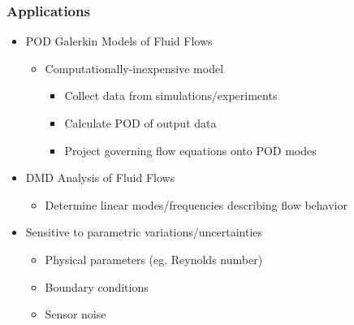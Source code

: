 \documentclass[9pt]{beamer}
\begin{document}
\begin{frame}
\frametitle{Applications}
\label{sec-1-2}

\begin{itemize}
\item POD Galerkin Models of Fluid Flows
\begin{itemize}
\item Computationally-inexpensive model
\begin{itemize}
\item Collect data from simulations/experiments
\item Calculate POD of output data
\item Project governing flow equations onto POD modes
\end{itemize}
\end{itemize}
\item DMD Analysis of Fluid Flows
\begin{itemize}
\item Determine linear modes/frequencies describing flow behavior
\end{itemize}
\item Sensitive to parametric variations/uncertainties
\begin{itemize}
\item Physical parameters (eg. Reynolds number)
\item Boundary conditions
\item Sensor noise
\end{itemize}
\end{itemize}
\end{frame}
\end{document}
